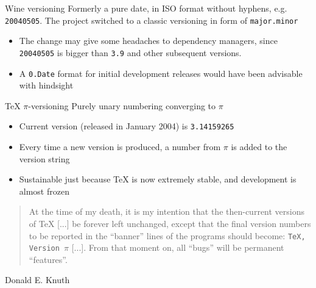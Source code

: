 \documentclass[presentation]{beamer}
\begin{document}
\begin{frame}{Wine versioning}
    Formerly a pure date, in ISO format without hyphens, e.g. \texttt{20040505}. The project switched to a classic versioning in form of \texttt{major.minor}
    \begin{itemize}
        \item The change may give some headaches to dependency managers, since \texttt{20040505} is bigger than \texttt{3.9} and other subsequent versions.
        \item A \texttt{0.Date} format for initial development releases would have been advisable with hindsight
    \end{itemize}
\end{frame}

\begin{frame}{\TeX{} $\pi$-versioning}
    Purely unary numbering converging to $\pi$
    \begin{itemize}
        \item Current version (released in January 2004) is \texttt{3.14159265}
        \item Every time a new version is produced, a number from $\pi$ is added to the version string
        \item Sustainable just because \TeX{} is now extremely stable, and development is almost frozen
    \end{itemize}
    \begin{block}{}
        \begin{quote}
            At the time of my death, it is my intention that the then-current versions of \TeX{} [...] be forever left unchanged, except that the final version numbers to be reported in the ``banner'' lines of the programs should become: \texttt{TeX, Version $\pi$} [...]. From that moment on, all ``bugs'' will be permanent ``features''.
        \end{quote}
        \begin{flushright}
            Donald E. Knuth \cite{Knuth1990tex}
        \end{flushright}
    \end{block}
\end{frame}
\end{document}

